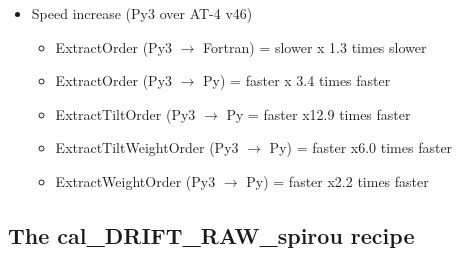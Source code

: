 \begin{itemize}
\begin{itemize}
	\item Speed increase (Py3 over AT-4 v46)
		\begin{itemize}
		\item ExtractOrder (Py3 $\rightarrow$ Fortran) = slower    x 1.3 times slower
		\item ExtractOrder (Py3 $\rightarrow$ Py) = faster     x 3.4 times faster
		\item ExtractTiltOrder (Py3 $\rightarrow$ Py = faster     x12.9 times faster
		\item ExtractTiltWeightOrder (Py3 $\rightarrow$ Py) = faster    x6.0 times faster
		\item ExtractWeightOrder (Py3 $\rightarrow$ Py) = faster    x2.2 times faster
		\end{itemize}

	\end{itemize}

\end{itemize}


\subsection{The cal\_DRIFT\_RAW\_spirou recipe}
\label{ch:changelog:At4:cal_DRIFT_RAW_spirou}

